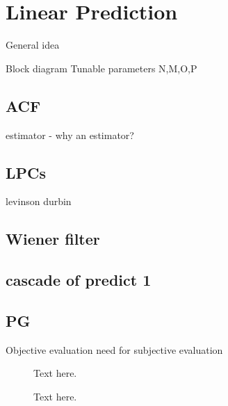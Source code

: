\section{Linear Prediction}
General idea

Block diagram
Tunable parameters N,M,O,P


\subsection{ACF}
estimator - why an estimator?

\subsection{LPCs}
levinson durbin

\subsection{Wiener filter}

\subsection{cascade of predict 1}

\subsection{PG}
Objective evaluation
need for subjective evaluation


\begin{figure}[H]
	
	\label{Fig:BasisCompare}
	\caption{Text here.}
\end{figure}

\begin{figure}[H]
	
	\label{Fig:LPCompare}
	\caption{Text here.}
\end{figure}


